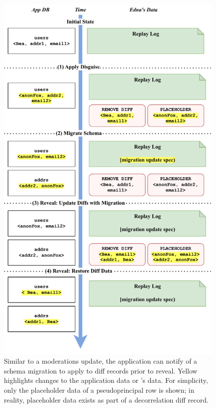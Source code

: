 \begin{figure}
    \centering
    \includegraphics[width=.8\textwidth]{figs/update-migration}
  \caption{Similar to a moderations update, the application can notify \sys of a
    schema migration to apply to diff records prior to reveal. Yellow 
    highlights changes to the application data or \sys's data. For simplicity,
    only the placeholder data of a pseudoprincipal row is shown; in reality,
    placeholder data exists as part of \eg a decorrelation diff record.}
\label{f:update:schema}
\end{figure}
    
